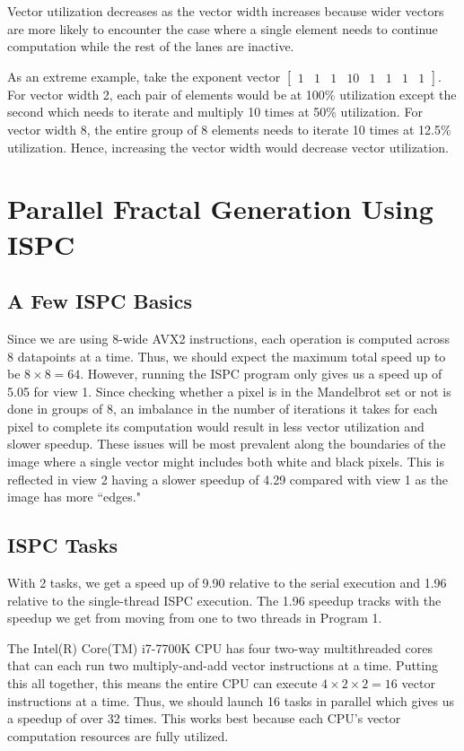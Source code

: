 \documentclass[11pt]{article}
\begin{document}
Vector utilization decreases as the vector width increases because wider vectors
are more likely to encounter the case where a single element needs to continue
computation while the rest of the lanes are inactive. 

\smallskip
As an extreme example, take the exponent vector $\begin{bmatrix} 1 & 1 & 1 & 10
& 1 & 1 & 1 & 1 \end{bmatrix}$. For vector width 2, each pair of elements would
be at 100\% utilization except the second which needs to iterate and multiply 10
times at 50\% utilization. For vector width 8, the entire group of 8 elements
needs to iterate 10 times at 12.5\% utilization. Hence, increasing the vector
width would decrease vector utilization.

\section{Parallel Fractal Generation Using ISPC}

\subsection{A Few ISPC Basics}

Since we are using 8-wide AVX2 instructions, each operation is
computed across 8 datapoints at a time. Thus, we should expect the maximum total
speed up to be $8 \times 8 = 64$. However, running the ISPC program only gives
us a speed up of 5.05 for view 1. Since checking whether a pixel is in the
Mandelbrot set or not is done in groups of 8, an imbalance in the number of
iterations it takes for each pixel to complete its computation would result in
less vector utilization and slower speedup. These issues will be most prevalent
along the boundaries of the image where a single vector might includes both
white and black pixels. This is reflected in view 2 having a slower speedup of
4.29 compared with view 1 as the image has more ``edges."

\subsection{ISPC Tasks}

With 2 tasks, we get a speed up of 9.90 relative to the serial execution and
1.96 relative to the single-thread ISPC execution. The 1.96 speedup tracks with
the speedup we get from moving from one to two threads in Program 1.

\smallskip
The Intel(R) Core(TM) i7-7700K CPU has four two-way multithreaded cores that can
each run two multiply-and-add vector instructions at a time. Putting this all
together, this means the entire CPU can execute $4 \times 2 \times 2 = 16$
vector instructions at a time. Thus, we should launch 16 tasks in parallel which
gives us a speedup of over 32 times. This works best because each CPU's
vector computation resources are fully utilized.
\end{document}
